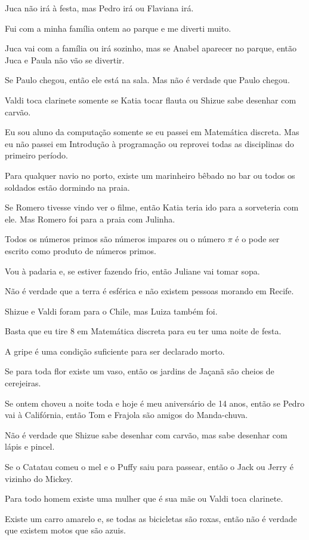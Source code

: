 \begin{exerList}
 \item Juca não irá à festa, mas Pedro irá ou Flaviana irá.
 \item Fui com a minha família ontem ao parque e me diverti muito.
 \item Juca vai com a família ou irá sozinho, mas se Anabel aparecer no parque, então Juca e Paula não vão se divertir.
 \item Se Paulo chegou, então ele está na sala. Mas não é verdade que Paulo chegou.
 \item Valdi toca clarinete somente se Katia tocar flauta ou Shizue sabe desenhar com carvão.
 \item Eu sou aluno da computação somente se eu passei em Matemática discreta. Mas eu não passei em Introdução à programação ou reprovei todas as disciplinas do primeiro período.
 \item Para qualquer navio no porto, existe um marinheiro bêbado no bar ou todos os soldados estão dormindo na praia.
 \item Se Romero tivesse vindo ver o filme, então Katia teria ido para a sorveteria com ele. Mas Romero foi para a praia com Julinha.
 \item Todos os números primos são números impares ou o número $\pi$ é o pode ser escrito como produto de números primos.
 \item Vou à padaria e, se estiver fazendo frio, então Juliane vai tomar sopa.
 \item Não é verdade que a terra é esférica e não existem pessoas morando em Recife.
 \item Shizue e Valdi foram para o Chile, mas Luiza também foi.
 \item Basta que eu tire 8 em Matemática discreta para eu ter uma noite de festa.
 \item A gripe é uma condição suficiente para ser declarado morto.
 \item Se para toda flor existe um vaso, então os jardins de Jaçanã são cheios de cerejeiras.
 \item Se ontem choveu a noite toda e hoje é meu aniversário de 14 anos, então se Pedro vai à Califórnia, então Tom e Frajola são amigos do Manda-chuva.
 \item Não é verdade que Shizue sabe desenhar com carvão, mas sabe desenhar com lápis e pincel.
 \item Se o Catatau comeu o mel e o Puffy saiu para passear, então o Jack ou Jerry é vizinho do Mickey.
 \item Para todo homem existe uma mulher que é sua mãe ou Valdi toca clarinete.
 \item Existe um carro amarelo e, se todas as bicicletas são roxas, então não é verdade que existem motos que são azuis.
\end{exerList}







